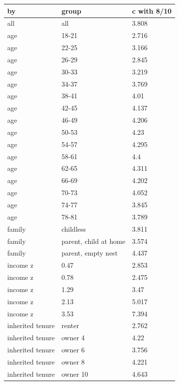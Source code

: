 \begingroup\small
\setlength{\tabcolsep}{3pt}
\renewcommand{\arraystretch}{1.04}
\begin{tabularx}{\linewidth}{XXX}
\toprule
by & group & c with 8/10 \\
\midrule
all & all & 3.808 \\
age & 18-21 & 2.716 \\
age & 22-25 & 3.166 \\
age & 26-29 & 2.845 \\
age & 30-33 & 3.219 \\
age & 34-37 & 3.769 \\
age & 38-41 & 4.01 \\
age & 42-45 & 4.137 \\
age & 46-49 & 4.206 \\
age & 50-53 & 4.23 \\
age & 54-57 & 4.295 \\
age & 58-61 & 4.4 \\
age & 62-65 & 4.311 \\
age & 66-69 & 4.202 \\
age & 70-73 & 4.052 \\
age & 74-77 & 3.845 \\
age & 78-81 & 3.789 \\
family & childless & 3.811 \\
family & parent, child at home & 3.574 \\
family & parent, empty nest & 4.437 \\
income z & 0.47 & 2.853 \\
income z & 0.78 & 2.475 \\
income z & 1.29 & 3.47 \\
income z & 2.13 & 5.017 \\
income z & 3.53 & 7.394 \\
inherited tenure & renter & 2.762 \\
inherited tenure & owner 4 & 4.22 \\
inherited tenure & owner 6 & 3.756 \\
inherited tenure & owner 8 & 4.221 \\
inherited tenure & owner 10 & 4.643 \\
\bottomrule
\end{tabularx}
\endgroup
